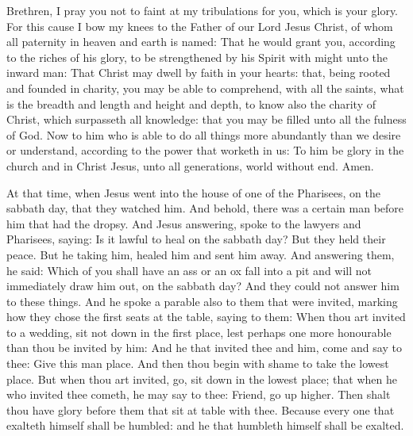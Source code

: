 Brethren, I pray you not to faint at my tribulations for you,
which is your glory.
For this cause I bow my knees to the Father of our Lord Jesus
Christ,
of whom all paternity in heaven and earth is named:
That he would grant you, according to the riches of his glory, to
be strengthened by his Spirit with might unto the inward man:
That Christ may dwell by faith in your hearts: that, being rooted
and founded in charity,
you may be able to comprehend, with all the saints, what is the
breadth and length and height and depth,
to know also the charity of Christ, which surpasseth all
knowledge: that you may be filled unto all the fulness of God.
Now to him who is able to do all things more abundantly than we
desire or understand, according to the power that worketh in us:
To him be glory in the church and in Christ Jesus, unto all
generations, world without end. Amen.



At that time, when Jesus went into the house of one of the
Pharisees, on the sabbath day, that they watched him.
And behold, there was a certain man before him that had the
dropsy.
And Jesus answering, spoke to the lawyers and Pharisees, saying:
Is it lawful to heal on the sabbath day?
But they held their peace. But he taking him, healed him and sent
him away.
And answering them, he said: Which of you shall have an ass or an
ox fall into a pit and will not immediately draw him out, on the sabbath
day?
And they could not answer him to these things.
And he spoke a parable also to them that were invited, marking how
they chose the first seats at the table, saying to them:
When thou art invited to a wedding, sit not down in the first
place, lest perhaps one more honourable than thou be invited by him:
And he that invited thee and him, come and say to thee: Give this
man place. And then thou begin with shame to take the lowest place.
But when thou art invited, go, sit down in the lowest place; that
when he who invited thee cometh, he may say to thee: Friend, go up
higher. Then shalt thou have glory before them that sit at table with
thee.
Because every one that exalteth himself shall be humbled: and he
that humbleth himself shall be exalted.



\bigskip


